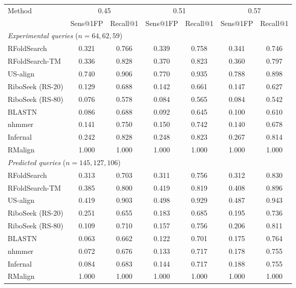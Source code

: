 \begin{tabular}{lcccccc}
\toprule
Method & \multicolumn{2}{c}{0.45} & \multicolumn{2}{c}{0.51} & \multicolumn{2}{c}{0.57} \\
 & Sens@1FP & Recall@1 & Sens@1FP & Recall@1 & Sens@1FP & Recall@1 \\
\midrule
\multicolumn{7}{l}{\textit{Experimental queries} ($n = 64, 62, 59$)} \\
\quad RFoldSearch & 0.321 & 0.766 & 0.339 & 0.758 & 0.341 & 0.746 \\
\quad RFoldSearch-TM & 0.336 & 0.828 & 0.370 & 0.823 & 0.360 & 0.797 \\
\quad US-align & 0.740 & 0.906 & 0.770 & 0.935 & 0.788 & 0.898 \\
\quad RiboSeek (RS-20) & 0.129 & 0.688 & 0.142 & 0.661 & 0.147 & 0.627 \\
\quad RiboSeek (RS-80) & 0.076 & 0.578 & 0.084 & 0.565 & 0.084 & 0.542 \\
\quad BLASTN & 0.086 & 0.688 & 0.092 & 0.645 & 0.100 & 0.610 \\
\quad nhmmer & 0.141 & 0.750 & 0.150 & 0.742 & 0.140 & 0.678 \\
\quad Infernal & 0.242 & 0.828 & 0.248 & 0.823 & 0.267 & 0.814 \\
\quad RMalign & 1.000 & 1.000 & 1.000 & 1.000 & 1.000 & 1.000 \\
\midrule
\multicolumn{7}{l}{\textit{Predicted queries} ($n = 145, 127, 106$)} \\
\quad RFoldSearch & 0.313 & 0.703 & 0.311 & 0.756 & 0.312 & 0.830 \\
\quad RFoldSearch-TM & 0.385 & 0.800 & 0.419 & 0.819 & 0.408 & 0.896 \\
\quad US-align & 0.419 & 0.903 & 0.498 & 0.929 & 0.487 & 0.943 \\
\quad RiboSeek (RS-20) & 0.251 & 0.655 & 0.183 & 0.685 & 0.195 & 0.736 \\
\quad RiboSeek (RS-80) & 0.109 & 0.710 & 0.157 & 0.756 & 0.206 & 0.811 \\
\quad BLASTN & 0.063 & 0.662 & 0.122 & 0.701 & 0.175 & 0.764 \\
\quad nhmmer & 0.072 & 0.676 & 0.133 & 0.717 & 0.178 & 0.755 \\
\quad Infernal & 0.084 & 0.683 & 0.144 & 0.717 & 0.188 & 0.755 \\
\quad RMalign & 1.000 & 1.000 & 1.000 & 1.000 & 1.000 & 1.000 \\
\bottomrule
\end{tabular}

